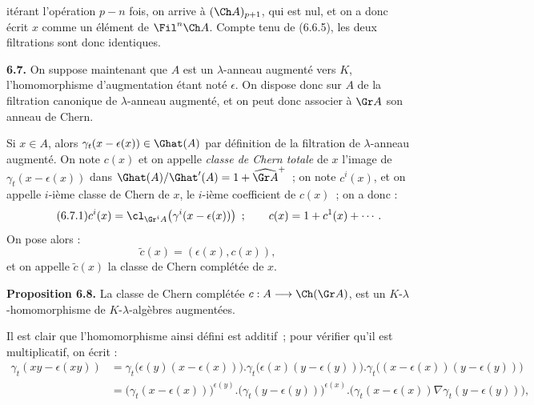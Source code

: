 itérant l'opération \(p-n\) fois, on arrive à \((\Ch A)_{p+1}\), qui est nul, et on a donc écrit \(x\) comme un élément de \(\Fil^n\Ch A\). Compte tenu de (6.6.5), les deux filtrations sont donc identiques.

\textbf{6.7.} On suppose maintenant que \(A\) est un \(\lambda\)-anneau augmenté vers \(K\), l'homomorphisme d'augmentation étant noté \(\epsilon\). On dispose donc sur \(A\) de la filtration canonique de \(\lambda\)-anneau augmenté, et on peut donc associer à \(\Gr A\) son anneau de Chern.

Si \(x\in A\), alors \(\gamma_t(x-\epsilon(x))\in\Ghat(A)\) par définition de la filtration de \(\lambda\)-anneau augmenté. On note \(c(x)\) et on appelle \emph{classe de Chern totale} de \(x\) l'image de \(\gamma_t(x-\epsilon(x))\) dans \(\Ghat(A)/\Ghat'(A)=1+\widehat{\Gr A}^{+}\)~; on note \(c^i(x)\), et on appelle \(i\)-ième classe de Chern de \(x\), le \(i\)-ième coefficient de \(c(x)\)~; on a donc :
\begin{equation}\tag{6.7.1}
  c^i(x)=\cl_{\Gr^iA}\!\left(\gamma^i(x-\epsilon(x))\right)~;\qquad
  c(x)=1+c^1(x)+\cdots .
\end{equation}
On pose alors :
\begin{equation}\tag{6.7.2}
  \widetilde c(x)=(\epsilon(x),c(x)),
\end{equation}
et on appelle \(\widetilde c(x)\) la classe de Chern complétée de \(x\).

\textbf{Proposition 6.8.} La classe de Chern complétée \(c:A\longrightarrow\Ch(\Gr A)\), est un \(K\)-\(\lambda\)-homomorphisme de \(K\)-\(\lambda\)-algèbres augmentées.

Il est clair que l'homomorphisme ainsi défini est additif~; pour vérifier qu'il est multiplicatif, on écrit :
\[
\begin{aligned}
\gamma_t(xy-\epsilon(xy))
&=\gamma_t\bigl(\epsilon(y)(x-\epsilon(x))\bigr).
  \gamma_t\bigl(\epsilon(x)(y-\epsilon(y))\bigr).
  \gamma_t\bigl((x-\epsilon(x))(y-\epsilon(y))\bigr)\\
&=\bigl(\gamma_t(x-\epsilon(x))\bigr)^{\epsilon(y)}.
  \bigl(\gamma_t(y-\epsilon(y))\bigr)^{\epsilon(x)}.
  \bigl(\gamma_t(x-\epsilon(x))\nabla\gamma_t(y-\epsilon(y))\bigr),
\end{aligned}
\]
